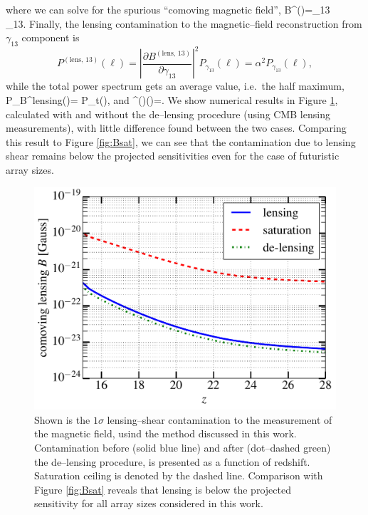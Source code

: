 where we can solve for the spurious ``comoving magnetic field'',
\beq
\bga
B^{()}=\gamma_{13}\nonumber\\
\equiv\alpha\gamma_{13}.
\ega
\eeq
Finally, the lensing contamination to the magnetic--field reconstruction from $\gamma_{13}$ component is
\begin{equation}
P^{(\text{lens, 13})}(\ell)=\left\vert\frac{\partial B^{(\text{lens, 13})}}{\partial\gamma_{13}}\right\vert^2 P_{\gamma_{13}}(\ell)=\alpha^2 P_{\gamma_{13}}(\ell),
\end{equation}
while the total power spectrum gets an average value, i.e.~the half maximum,
\beq
P_B^{\rm lensing}(\ell)= P_t(\ell),
\eeq
and %
\beq
\Delta^{()}(\ell)=.
\eeq
We show numerical results in Figure \ref{fig:lensing_B}, calculated with and without the de--lensing procedure (using CMB lensing measurements), with little difference found between the two cases. Comparing this result to Figure \ref{fig:Bsat}, we can see that the contamination due to lensing shear remains below the projected sensitivities even for the case of futuristic array sizes.
\begin{figure}[h]
\centering
\includegraphics[scale=0.4]{delensingB.pdf}
\caption{Shown is the $1\sigma$ lensing--shear contamination to the measurement of the magnetic field, usind the method discussed in this work. Contamination before (solid blue line) and after (dot--dashed green) the de--lensing procedure, is presented as a function of redshift. Saturation ceiling is denoted by the dashed line. Comparison with Figure \ref{fig:Bsat} reveals that lensing is below the projected sensitivity for all array sizes considered in this work.}
\label{fig:lensing_B}
\end{figure}
